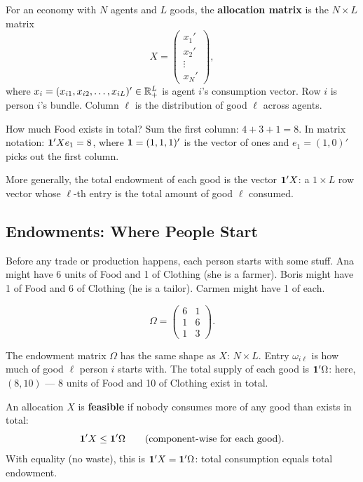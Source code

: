 \documentclass[../structural_economics_book.tex]{subfiles}
\begin{document}
\begin{definition}\label{ch01:def:allocation}
For an economy with $N$ agents and $L$ goods, the \textbf{allocation matrix} is the $N \times L$ matrix
\begin{equation}\label{ch01:eq:X}
X = \begin{pmatrix} x_1' \\ x_2' \\ \vdots \\ x_N' \end{pmatrix},
\end{equation}
where $x_i = (x_{i1}, x_{i2}, \ldots, x_{iL})' \in \mathbb{R}^L_+$ is agent $i$'s consumption vector. Row $i$ is person $i$'s bundle. Column $\ell$ is the distribution of good $\ell$ across agents.
\end{definition}

How much Food exists in total? Sum the first column: $4 + 3 + 1 = 8$. In matrix notation: $\mathbf{1}'X e_1 = 8$, where $\mathbf{1} = (1, 1, 1)'$ is the vector of ones and $e_1 = (1, 0)'$ picks out the first column.

More generally, the total endowment of each good is the vector $\mathbf{1}'X$: a $1 \times L$ row vector whose $\ell$-th entry is the total amount of good $\ell$ consumed.


\subsection{Endowments: Where People Start}

Before any trade or production happens, each person starts with some stuff. Ana might have 6 units of Food and 1 of Clothing (she is a farmer). Boris might have 1 of Food and 6 of Clothing (he is a tailor). Carmen might have 1 of each.

\begin{equation}\label{ch01:eq:Omega_example}
\Omega = \begin{pmatrix} 6 & 1 \\ 1 & 6 \\ 1 & 3 \end{pmatrix}.
\end{equation}

The endowment matrix $\Omega$ has the same shape as $X$: $N \times L$. Entry $\omega_{i\ell}$ is how much of good $\ell$ person $i$ starts with. The total supply of each good is $\mathbf{1}'\Omega$: here, $(8, 10)$ --- 8 units of Food and 10 of Clothing exist in total.

\begin{definition}[Feasibility]\label{ch01:def:feasibility}
An allocation $X$ is \textbf{feasible} if nobody consumes more of any good than exists in total:
\begin{equation}
\mathbf{1}'X \leq \mathbf{1}'\Omega \qquad (\text{component-wise for each good}).
\end{equation}
With equality (no waste), this is $\mathbf{1}'X = \mathbf{1}'\Omega$: total consumption equals total endowment.
\end{definition}
\end{document}
